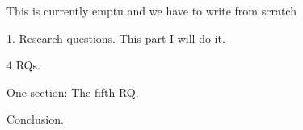 
This is currently emptu and we have to write from scratch

1. Research questions. 
This part I will do it. 

4 RQs.


One section: The fifth RQ. 

Conclusion. 